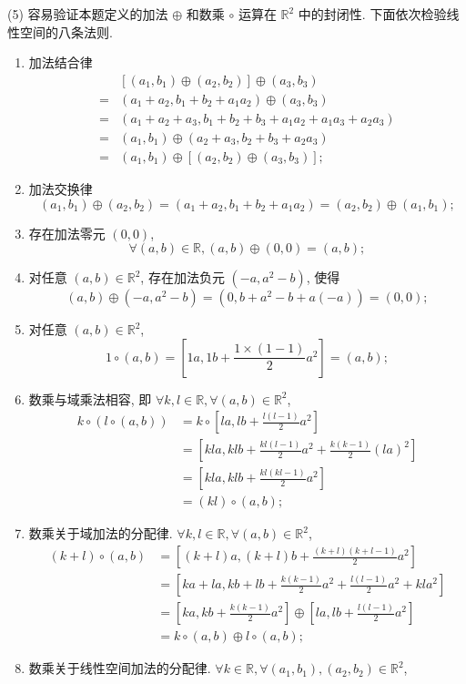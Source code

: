 \documentclass[11pt,a4paper,openany,oneside]{book}
\begin{document}
(5) 容易验证本题定义的加法 $\oplus$ 和数乘 $\circ$ 运算在 $\mathbb{R}^2$ 中的封闭性. 下面依次检验线性空间的八条法则. 
\begin{enumerate}[(\romannumeral1)]
\item 加法结合律
\begin{align*}
	&[(a_1,b_1)\oplus(a_2,b_2)]\oplus(a_3,b_3)\\
	=&(a_1+a_2,b_1+b_2+a_1a_2)\oplus(a_3,b_3)\\
	=&(a_1+a_2+a_3,b_1+b_2+b_3+a_1a_2+a_1a_3+a_2a_3)\\
	=&(a_1,b_1)\oplus(a_2+a_3,b_2+b_3+a_2a_3)\\
	=&(a_1,b_1)\oplus[(a_2,b_2)\oplus(a_3,b_3)];
\end{align*}
\item 加法交换律
\[
(a_1,b_1)\oplus(a_2,b_2)=(a_1+a_2,b_1+b_2+a_1a_2)=(a_2,b_2)\oplus(a_1,b_1);
\]
\item 存在加法零元 $(0,0)$, 
\[
\forall (a,b)\in \mathbb{R}, (a,b)\oplus(0,0)=(a,b);
\]
\item 对任意 $(a,b)\in\mathbb{R}^2$, 存在加法负元 $(-a,a^2-b)$, 使得
\[
(a,b)\oplus(-a,a^2-b)=(0,b+a^2-b+a(-a))=(0,0);
\]
\item 对任意 $(a,b)\in\mathbb{R}^2$,
\[
1\circ(a,b)=\left[1a,1b+\frac{1\times(1-1)}{2}a^2\right]=(a,b);
\]
\item 数乘与域乘法相容, 即 $\forall k,l\in \mathbb{R},\forall(a,b)\in\mathbb{R}^2$,
\begin{align*}
k\circ (l\circ(a,b))&=k\circ\left[la,lb+\frac{l(l-1)}{2}a^2\right]\\
&=\left[kla,klb+\frac{kl(l-1)}{2}a^2+\frac{k(k-1)}{2}(la)^2\right]\\
&=\left[kla,klb+\frac{kl(kl-1)}{2}a^2\right]\\
&=(kl)\circ(a,b);
\end{align*}
\item 数乘关于域加法的分配律. $\forall k,l\in \mathbb{R},\forall(a,b)\in\mathbb{R}^2$,
\begin{align*}
(k+l)\circ(a,b) &=\left[(k+l)a,(k+l)b+\frac{(k+l)(k+l-1)}{2}a^2\right]\\
&=\left[ka+la,kb+lb+\frac{k(k-1)}{2}a^2+\frac{l(l-1)}{2}a^2+kla^2\right]\\
&=\left[ka,kb+\frac{k(k-1)}{2}a^2\right]\oplus\left[la,lb+\frac{l(l-1)}{2}a^2\right]\\
&=k\circ(a,b)\oplus l\circ(a,b);
\end{align*}
\item 数乘关于线性空间加法的分配律. $\forall k\in \mathbb{R},\forall(a_1,b_1),(a_2,b_2)\in\mathbb{R}^2$,

\end{enumerate}
\end{document}

